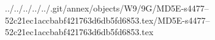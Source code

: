 ../../../../../.git/annex/objects/W9/9G/MD5E-s4477--52c21ec1accbabf421763d6db5fd6853.tex/MD5E-s4477--52c21ec1accbabf421763d6db5fd6853.tex
